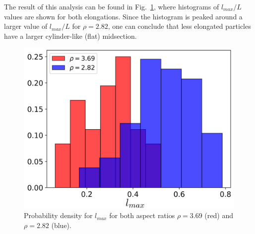 \documentclass[aip,graphicx]{revtex4-1} %
\begin{document}
The result of this analysis can be found in Fig.~\ref{fig:maxlength_div}, where histograms of $l_{max}/L$ values are shown
for both elongations. Since the histogram is peaked around a larger value of $l_{max}/L$ for $\rho=2.82$, one can conclude
that less elongated particles have a larger cylinder-like (flat) midsection. 

\begin{figure}
    \centering
    \includegraphics[width=0.5\columnwidth]{maxlength_div.png}
    \caption{Probability density for $l_{max}$ for both aspect ratios $\rho=3.69$ (red) and $\rho=2.82$ (blue).}\label{fig:maxlength_div}
\end{figure}


\end{document}

